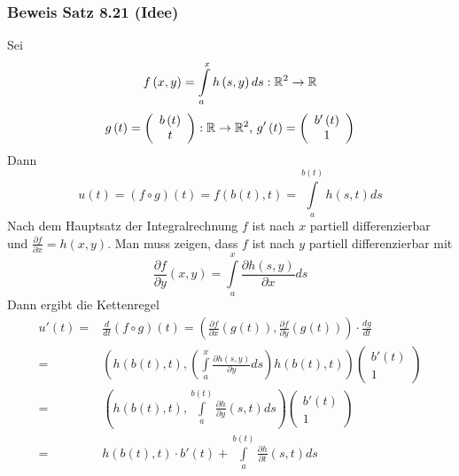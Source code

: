 \subsubsection*{Beweis Satz 8.21 (Idee)}
Sei \[f\left( {x,y} \right) = \int\limits_a^x {h\left( {s,y} \right)ds}:\mathbb{R}^2\to\mathbb{R} \]
\[g\left( t \right) = \left( {\begin{array}{*{20}{c}}
{b\left( t \right)}\\
t
\end{array}} \right):\R\to\R^2\text{, }g'\left( t \right) = \left( {\begin{array}{*{20}{c}}
{b'\left( t \right)}\\
1
\end{array}} \right)\]
Dann \[u(t) = \left( {f \circ g} \right)(t) = f\left( {b(t),t} \right) = \int\limits_a^{b(t)} {h(s,t)ds} \]
Nach dem Hauptsatz der Integralrechnung $f$ ist nach $x$ partiell differenzierbar und $\frac{\partial f}{\partial x}=h(x,y)$. Man muss zeigen, dass $f$ ist nach $y$ partiell differenzierbar mit \[\frac{{\partial f}}{{\partial y}}(x,y) = \int\limits_a^x {\frac{{\partial h(s,y)}}{{\partial x}}ds} \]
Dann ergibt die Kettenregel
\begin{align*}
u'(t) = &\frac{d}{{dt}}\left( {f \circ g} \right)(t) = \left( {\frac{{\partial f}}{{\partial x}}\left( {g(t)} \right),\frac{{\partial f}}{{\partial y}}\left( {g(t)} \right)} \right) \cdot \frac{{dg}}{{dt}}\\
= &\left( {h\left( {b(t),t} \right),\left( {\int\limits_a^x {\frac{{\partial h(s,y)}}{{\partial y}}ds} } \right)h\left( {b(t),t} \right)} \right)\left( {\begin{array}{*{20}{c}}
{b'(t)}\\
1
\end{array}} \right)\\
= &\left( {h\left( {b(t),t} \right),\int\limits_a^{b(t)} {\frac{{\partial h}}{{\partial y}}(s,t)ds} } \right)\left( {\begin{array}{*{20}{c}}
{b'(t)}\\
1
\end{array}} \right)\\
= & h\left( {b(t),t} \right) \cdot b'(t) + \int\limits_a^{b(t)} {\frac{{\partial h}}{{\partial t}}(s,t)ds}
\end{align*}
